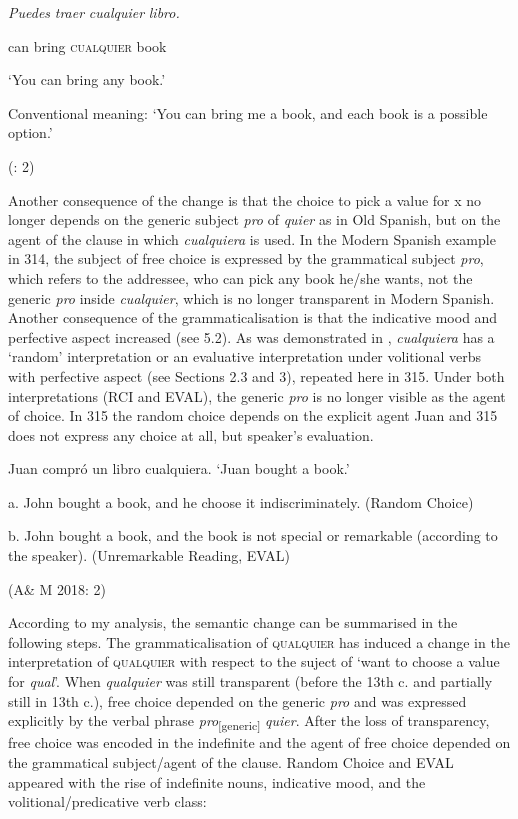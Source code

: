   \textit{Puedes}  \textit{traer}  \textit{cualquier}  \textit{libro.}    

  can  bring  \textsc{cualquier}  book    

  ‘You can bring any book.’

  Conventional meaning: ‘You can bring me a book, and each book is a possible option.’

  (\citealt{AloniEtAl2011}: 2)

Another consequence of the change is that the choice to pick a value for x no longer depends on the generic subject \textit{pro} of \textit{quier} as in Old Spanish, but on the agent of the clause in which \textit{cualquiera} is used. In the Modern Spanish example in 314, the subject of free choice is expressed by the grammatical subject \textit{pro}, which refers to the addressee, who can pick any book he/she wants, not the generic \textit{pro} inside \textit{cualquier}, which is no longer transparent in Modern Spanish. Another consequence of the grammaticalisation is that the indicative mood and perfective aspect increased (see 5.2). As was demonstrated in , \textit{cualquiera} has a ‘random’ interpretation or an evaluative interpretation under volitional verbs with perfective aspect (see Sections 2.3 and 3), repeated here in 315. Under both interpretations (RCI and EVAL), the generic \textit{pro} is no longer visible as the agent of choice. In 315 the random choice depends on the explicit agent Juan and 315 does not express any choice at all, but speaker’s evaluation.

  Juan compró un libro cualquiera. ‘Juan bought a book.’

  a.  John bought a book, and he choose it indiscriminately. (Random Choice)

  b.  John bought a book, and the book is not special or remarkable (according to the speaker). (Unremarkable Reading, EVAL)

    (A\& M 2018: 2)

According to my analysis, the semantic change can be summarised in the following steps. The grammaticalisation of \textsc{qualquier} has induced a change in the interpretation of \textsc{qualquier} with respect to the suject of ‘want to choose a value for \textit{qual}’. When \textit{qualquier} was still transparent (before the 13th c. and partially still in 13th c.), free choice depended on the generic \textit{pro} and was expressed explicitly by the verbal phrase \textit{pro}\textsubscript{[generic]} \textit{quier}. After the loss of transparency, free choice was encoded in the indefinite and the agent of free choice depended on the grammatical subject/agent of the clause. Random Choice and EVAL appeared with the rise of indefinite nouns, indicative mood, and the volitional/predicative verb class:

